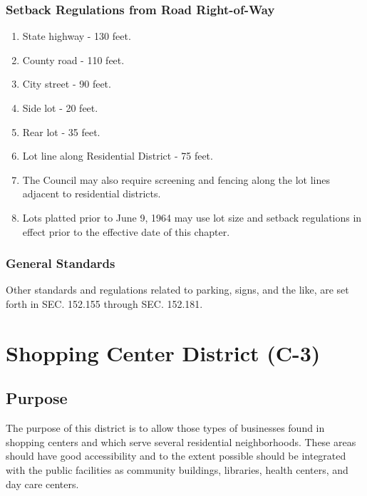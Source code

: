 \subsubsection{Setback Regulations from Road Right-of-Way}
\begin{enumerate}[{\indent}a)]
    \item State highway - 130 feet.
    \item County road - 110 feet.
    \item City street - 90 feet.
    \item Side lot - 20 feet.
    \item Rear lot - 35 feet.
    \item Lot line along Residential District - 75 feet.
    \item The Council may also require screening and fencing along the lot lines adjacent to residential districts.
    \item Lots platted prior to June 9, 1964 may use lot size and setback regulations in effect prior to the effective date of this chapter.
\end{enumerate}
\subsubsection{General Standards}
Other standards and regulations related to parking, signs, and the like, are set forth in SEC. 152.155 through SEC. 152.181.

\section{Shopping Center District (C-3)}
\subsection{Purpose}
The purpose of this district is to allow those types of businesses found in shopping centers and which serve several residential neighborhoods. These areas should have good accessibility and to the extent possible should be integrated with the public facilities as community buildings, libraries, health centers, and day care centers.

